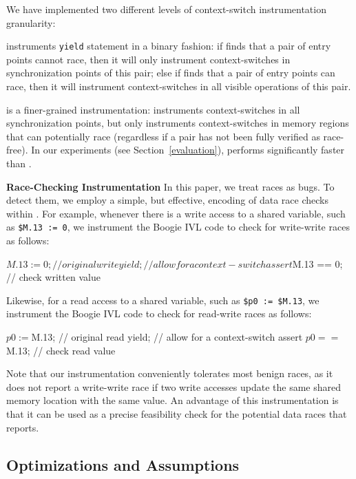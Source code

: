 {We have implemented two different levels of context-switch instrumentation granularity:

\yieldcoarse instruments \texttt{yield} statement in a binary fashion: if \whoop
finds that a pair of entry points cannot race, then it will only instrument
context-switches in synchronization points of this pair; else if \whoop finds
that a pair of entry points can race, then it will instrument context-switches
in all visible operations of this pair.

\yieldmr is a finer-grained instrumentation: \whoop instruments context-switches
in all synchronization points, but only instruments context-switches in memory
regions that can potentially race (regardless if a pair has not been fully
verified as race-free). In our experiments (see Section~\ref{evaluation}),
\yieldmr performs significantly faster than \yieldcoarse.

\noindent
\textbf{Race-Checking Instrumentation}\xspace\xspace In this paper, we treat races as bugs. To detect them, we employ a simple, but effective, encoding of data race checks within \corral.
For example, whenever there is a write access to a shared variable, such as
\texttt{\$M.13 := 0}, we instrument the Boogie IVL code to check for write-write
races as follows:
%
\begin{boogie}
$M.13 := 0;        // original write
yield;             // allow for a context-switch
assert $M.13 == 0; // check written value
\end{boogie}
%
Likewise, for a read access to a shared variable, such as \texttt{\$p0 :=
\$M.13}, we instrument the Boogie IVL code to check for read-write races as
follows:
%
\begin{boogie}
$p0 := $M.13;        // original read
yield;               // allow for a context-switch
assert $p0 == $M.13; // check read value
\end{boogie}

Note that our instrumentation conveniently tolerates most benign races, as it does not report a write-write race if two write accesses update the same shared memory location with the same value.  An advantage of this instrumentation is that it can be used as a precise feasibility check for the potential data races that \whoop reports.

\subsection{Optimizations and Assumptions}
\label{whoop:optimizations}

}
